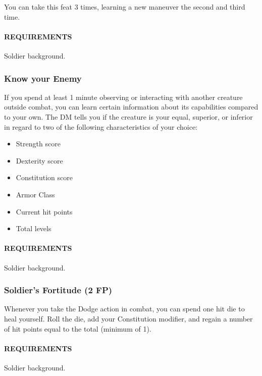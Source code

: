        You can take this feat 3 times, learning a new maneuver the second and third time.
        \paragraph{REQUIREMENTS} Soldier background.

    \subsubsection{Know your Enemy} \label{feat::knowyourenemy}
        If you spend at least 1 minute observing or interacting with another creature outside combat, you can learn certain information about its capabilities compared to your own.
        The DM tells you if the creature is your equal, superior, or inferior in regard to two of the following characteristics of your choice:
        \begin{itemize}
            \item Strength score
            \item Dexterity score
            \item Constitution score
            \item Armor Class
            \item Current hit points
            \item Total levels
        \end{itemize}

        \paragraph{REQUIREMENTS} Soldier background.

    \subsubsection{Soldier's Fortitude (2 FP)} \label{feat::soldiersfortitude}
        Whenever you take the Dodge action in combat, you can spend one hit die to heal yourself.
        Roll the die, add your Constitution modifier, and regain a number of hit points equal to the total (minimum of 1).
        \paragraph{REQUIREMENTS} Soldier background.

